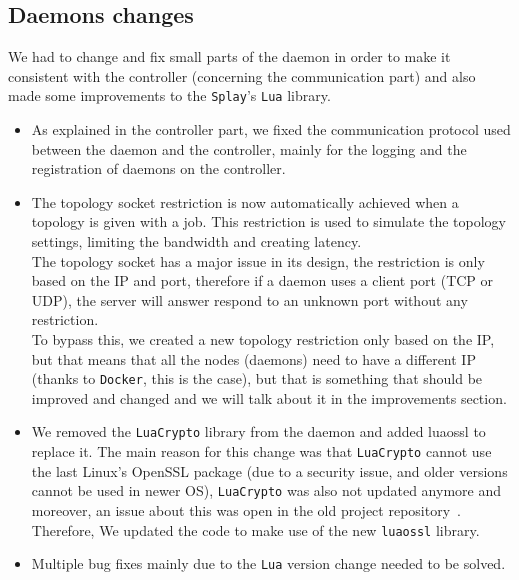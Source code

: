 \documentclass{eplmastersthesis}
\begin{document}
      \subsection{Daemons changes}

        We had to change and fix small parts of the daemon in order to make
        it consistent with the controller (concerning the communication part)
        and also made some improvements to the \texttt{Splay}'s \texttt{Lua} library.

        \begin{itemize}
          \item As explained in the controller part, we fixed the communication
          protocol used between the daemon and the controller, mainly for
          the logging and the registration of daemons on the controller.
          \item The topology socket restriction is now automatically achieved
          when a topology is given with a job. This restriction is used to
          simulate the topology settings, limiting the bandwidth and creating
          latency.\\
          The topology socket has a major issue in its design, the restriction
          is only based on the IP and port, therefore if a daemon uses a client
          port (TCP or UDP), the server will answer respond to an unknown port
          without any restriction.\\
          To bypass this, we created a new topology restriction only based on
          the IP, but that means that all the nodes (daemons) need to have a
          different IP (thanks to \texttt{Docker}, this is the case), but that is
          something that should be improved and changed and we will talk about
          it in the improvements section.
          \item We removed the \texttt{LuaCrypto} library from the daemon and added
          luaossl to replace it. The main reason for this change was that
          \texttt{LuaCrypto} cannot use the last Linux's OpenSSL package (due to a
          security issue, and older versions cannot be used in newer OS),
          \texttt{LuaCrypto} was also not updated anymore and moreover, an issue about
          this was open in the old project repository~\cite{sslLib}.\\
          Therefore, We updated the code to make use of the new \texttt{luaossl} library.
          \item Multiple bug fixes mainly due to the \texttt{Lua} version change needed
          to be solved.
        \end{itemize}
\end{document}
